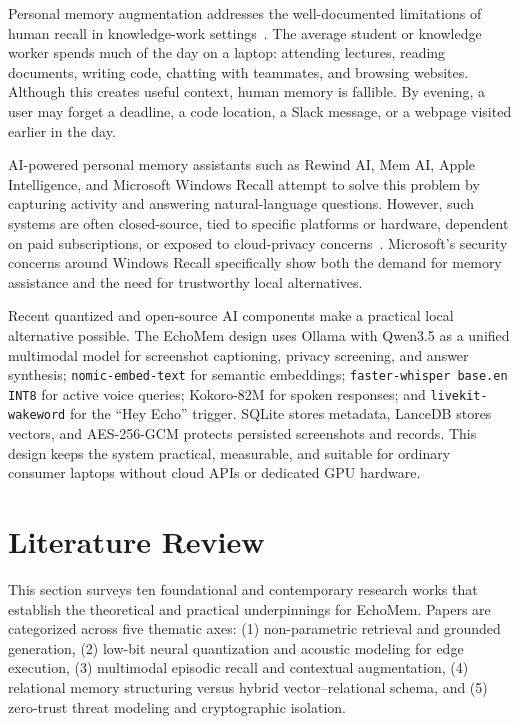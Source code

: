 \documentclass[conference]{IEEEtran}
\newcommand{\code}[1]{\texttt{#1}}
\begin{document}
Personal memory augmentation addresses the well-documented limitations of human
recall in knowledge-work settings~\cite{lewis2020rag}. The average student or
knowledge worker spends much of the day on a laptop: attending lectures, reading
documents, writing code, chatting with teammates, and browsing websites.
Although this creates useful context, human memory is fallible. By evening, a
user may forget a deadline, a code location, a Slack message, or a webpage
visited earlier in the day.

AI-powered personal memory assistants such as Rewind AI, Mem AI, Apple
Intelligence, and Microsoft Windows Recall attempt to solve this problem by
capturing activity and answering natural-language questions. However, such
systems are often closed-source, tied to specific platforms or hardware,
dependent on paid subscriptions, or exposed to cloud-privacy
concerns~\cite{radford2023whisper}. Microsoft's security concerns around Windows
Recall specifically show both the demand for memory assistance and the need for
trustworthy local alternatives.

Recent quantized and open-source AI components make a practical local
alternative possible. The EchoMem design uses Ollama with Qwen3.5 as a unified
multimodal model for screenshot captioning, privacy screening, and answer
synthesis; \code{nomic-embed-text} for semantic embeddings;
\code{faster-whisper base.en INT8} for active voice queries; Kokoro-82M for
spoken responses; and \code{livekit-wakeword} for the ``Hey Echo'' trigger.
SQLite stores metadata, LanceDB stores vectors, and AES-256-GCM protects
persisted screenshots and records. This design keeps the system practical,
measurable, and suitable for ordinary consumer laptops without cloud APIs or
dedicated GPU hardware.

\section{Literature Review}

This section surveys ten foundational and contemporary research works that
establish the theoretical and practical underpinnings for EchoMem. Papers are
categorized across five thematic axes: (1) non-parametric retrieval and grounded
generation, (2) low-bit neural quantization and acoustic modeling for edge
execution, (3) multimodal episodic recall and contextual augmentation,
(4) relational memory structuring versus hybrid vector--relational schema, and
(5) zero-trust threat modeling and cryptographic isolation.
\end{document}
